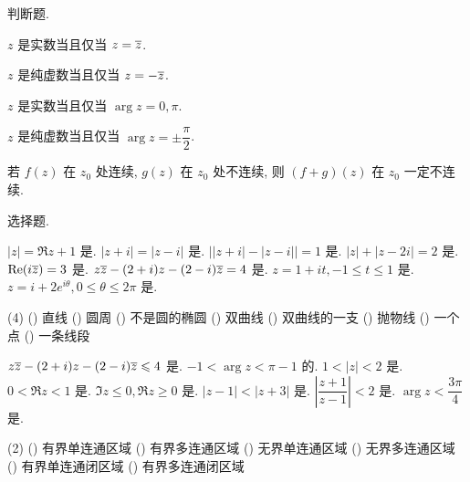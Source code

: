 \sectionHomework
\begin{homework}
  \item 判断题.
    \begin{exlist}
      \item $z$ 是实数当且仅当 $z=\overline z$. \fillbrace{}
      \item $z$ 是纯虚数当且仅当 $z=-\overline z$. \fillbrace{}
      \item $z$ 是实数当且仅当 $\arg z=0,\pi$. \fillbrace{}
      \item $z$ 是纯虚数当且仅当 $\arg z=\pm\dfrac\pi2$. \fillbrace{}
      \item 若 $f(z)$ 在 $z_0$ 处连续, $g(z)$ 在 $z_0$ 处不连续, 则 $(f+g)(z)$ 在 $z_0$ 一定不连续. \fillbrace{}
    \end{exlist}
  \item 选择题.
    \begin{exlist}
      \item \begin{tasks}
        \task $|z|=\Re z+1$ 是\fillbrace{}.
        \task $|z+i|=|z-i|$ 是\fillbrace{}.
        \task $\bigl||z+i|-|z-i|\bigr|=1$ 是\fillbrace{}.
        \task $|z|+|z-2i|=2$ 是\fillbrace{}.
        \task $\operatorname{Re}(i\overline z)=3$ 是\fillbrace{}.
        \task $z\overline z-(2+i)z-(2-i)\overline z=4$ 是\fillbrace{}.
        \task $z=1+it,-1\le t\le 1$ 是\fillbrace{}.
        \task $z=i+2e^{i\theta},0\le \theta\le 2\pi$ 是\fillbrace{}.
      \end{tasks}
        \begin{taskschoice}(4)
          () 直线
          () 圆周
          () 不是圆的椭圆
          () 双曲线
          () 双曲线的一支
          () 抛物线
          () 一个点
          () 一条线段
        \end{taskschoice}
      \item \begin{tasks}
        \task $z\overline z-(2+i)z-(2-i)\overline z\leqslant 4$ 是\fillbrace{}.
        \task $-1<\arg z<\pi-1$ 的\fillbrace{}.
        \task $1<|z|<2$ 是\fillbrace{}.
        \task $0<\Re z<1$ 是\fillbrace{}.
        \task $\Im z\le0,\Re z\ge0$ 是\fillbrace{}.
        \task $|z-1|<|z+3|$ 是\fillbrace{}.
        \task $\left|\dfrac{z+1}{z-1}\right|<2$ 是\fillbrace{}.
        \task $\arg z<\dfrac{3\pi}4$ 是\fillbrace{}.
      \end{tasks}
        \begin{taskschoice}(2)
          () 有界单连通区域
          () 有界多连通区域
          () 无界单连通区域
          () 无界多连通区域
          () 有界单连通闭区域
          () 有界多连通闭区域

\end{taskschoice}
\end{exlist}
\end{homework}
